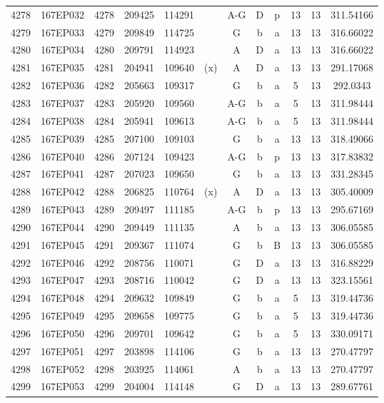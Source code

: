 \begin{tabular}{|*{12}{c|}}
4278 & 167EP032 & 4278 & 209425 & 114291 &  & A-G & D & p & 13 & 13 & 311.54166 \\ 
4279 & 167EP033 & 4279 & 209849 & 114725 &  & G & b & a & 13 & 13 & 316.66022 \\ 
4280 & 167EP034 & 4280 & 209791 & 114923 &  & A & D & a & 13 & 13 & 316.66022 \\ 
4281 & 167EP035 & 4281 & 204941 & 109640 & (x) & A & D & a & 13 & 13 & 291.17068 \\ 
4282 & 167EP036 & 4282 & 205663 & 109317 &  & G & b & a & 5 & 13 & 292.0343 \\ 
4283 & 167EP037 & 4283 & 205920 & 109560 &  & A-G & b & a & 5 & 13 & 311.98444 \\ 
4284 & 167EP038 & 4284 & 205941 & 109613 &  & A-G & b & a & 5 & 13 & 311.98444 \\ 
4285 & 167EP039 & 4285 & 207100 & 109103 &  & G & b & a & 13 & 13 & 318.49066 \\ 
4286 & 167EP040 & 4286 & 207124 & 109423 &  & A-G & b & p & 13 & 13 & 317.83832 \\ 
4287 & 167EP041 & 4287 & 207023 & 109650 &  & G & b & a & 13 & 13 & 331.28345 \\ 
4288 & 167EP042 & 4288 & 206825 & 110764 & (x) & A & D & a & 13 & 13 & 305.40009 \\ 
4289 & 167EP043 & 4289 & 209497 & 111185 &  & A-G & b & p & 13 & 13 & 295.67169 \\ 
4290 & 167EP044 & 4290 & 209449 & 111135 &  & A & b & a & 13 & 13 & 306.05585 \\ 
4291 & 167EP045 & 4291 & 209367 & 111074 &  & G & b & B & 13 & 13 & 306.05585 \\ 
4292 & 167EP046 & 4292 & 208756 & 110071 &  & G & D & a & 13 & 13 & 316.88229 \\ 
4293 & 167EP047 & 4293 & 208716 & 110042 &  & G & D & a & 13 & 13 & 323.15561 \\ 
4294 & 167EP048 & 4294 & 209632 & 109849 &  & G & b & a & 5 & 13 & 319.44736 \\ 
4295 & 167EP049 & 4295 & 209658 & 109775 &  & G & b & a & 5 & 13 & 319.44736 \\ 
4296 & 167EP050 & 4296 & 209701 & 109642 &  & G & b & a & 5 & 13 & 330.09171 \\ 
4297 & 167EP051 & 4297 & 203898 & 114106 &  & G & b & a & 13 & 13 & 270.47797 \\ 
4298 & 167EP052 & 4298 & 203925 & 114061 &  & A & b & a & 13 & 13 & 270.47797 \\ 
4299 & 167EP053 & 4299 & 204004 & 114148 &  & G & D & a & 13 & 13 & 289.67761 \\ 

\end{tabular}
